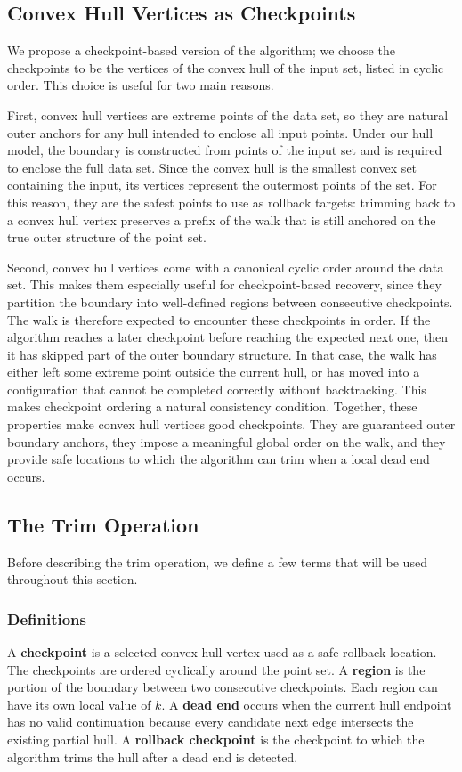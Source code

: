 \documentclass[a4paper,twoside]{article}
\begin{document}
\subsection{Convex Hull Vertices as Checkpoints}
We propose a checkpoint-based version of the algorithm; we choose the checkpoints to be the vertices of the convex hull of the input set, listed in cyclic order. This choice is useful for two main reasons.

First, convex hull vertices are extreme points of the data set, so they are natural outer anchors for any hull intended to enclose all input points. Under our hull model, the boundary is constructed from points of the input set and is required to enclose the full data set. Since the convex hull is the smallest convex set containing the input, its vertices represent the outermost points of the set. For this reason, they are the safest points to use as rollback targets: trimming back to a convex hull vertex preserves a prefix of the walk that is still anchored on the true outer structure of the point set.

Second, convex hull vertices come with a canonical cyclic order around the data set. This makes them especially useful for checkpoint-based recovery, since they partition the boundary into well-defined regions between consecutive checkpoints. The walk is therefore expected to encounter these checkpoints in order. If the algorithm reaches a later checkpoint before reaching the expected next one, then it has skipped part of the outer boundary structure. In that case, the walk has either left some extreme point outside the current hull, or has moved into a configuration that cannot be completed correctly without backtracking. This makes checkpoint ordering a natural consistency condition.
Together, these properties make convex hull vertices good checkpoints. They are guaranteed outer boundary anchors, they impose a meaningful global order on the walk, and they provide safe locations to which the algorithm can trim when a local dead end occurs.
\subsection{The Trim Operation}
Before describing the trim operation, we define a few terms that will be used throughout this section.
\subsubsection*{Definitions}
A \textbf{checkpoint} is a selected convex hull vertex used as a safe rollback location. The checkpoints are ordered cyclically around the point set.
A \textbf{region} is the portion of the boundary between two consecutive checkpoints. Each region can have its own local value of \(k\).
A \textbf{dead end} occurs when the current hull endpoint has no valid continuation because every candidate next edge intersects the existing partial hull.
A \textbf{rollback checkpoint} is the checkpoint to which the algorithm trims the hull after a dead end is detected.
\end{document}
